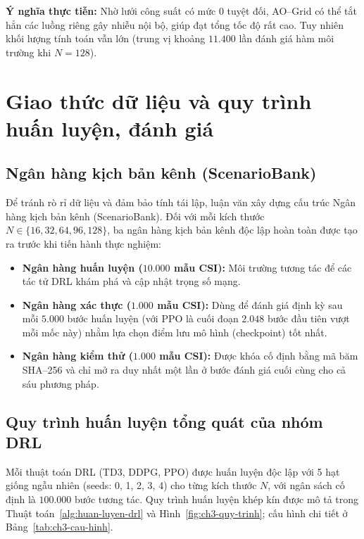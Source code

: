 \textbf{Ý nghĩa thực tiễn:} Nhờ lưới công suất có mức $0$ tuyệt đối, AO--Grid có thể tắt hẳn các luồng riêng gây
nhiễu nội bộ, giúp đạt tổng tốc độ rất cao. Tuy nhiên khối lượng tính toán vẫn lớn (trung vị khoảng $11.400$ lần
đánh giá hàm môi trường khi $N = 128$).



\section{Giao thức dữ liệu và quy trình huấn luyện, đánh giá}
\label{sec:giao-thuc-du-lieu}

\subsection{Ngân hàng kịch bản kênh (ScenarioBank)}
\label{ssec:ngan-hang}

Để tránh rò rỉ dữ liệu và đảm bảo tính tái lập, luận văn xây dựng cấu trúc Ngân hàng kịch bản kênh
(ScenarioBank). Đối với mỗi kích thước $N \in \{16, 32, 64, 96, 128\}$, ba ngân hàng kịch bản kênh độc lập hoàn
toàn được tạo ra trước khi tiến hành thực nghiệm:
\begin{itemize}
\item \textbf{Ngân hàng huấn luyện ($10.000$ mẫu CSI):} Môi trường tương tác để các tác tử DRL khám phá và cập
  nhật trọng số mạng.
\item \textbf{Ngân hàng xác thực ($1.000$ mẫu CSI):} Dùng để đánh giá định kỳ sau mỗi $5.000$ bước huấn luyện
  (với PPO là cuối đoạn $2.048$ bước đầu tiên vượt mỗi mốc này) nhằm lựa chọn điểm lưu mô hình (checkpoint) tốt
  nhất.
\item \textbf{Ngân hàng kiểm thử ($1.000$ mẫu CSI):} Được khóa cố định bằng mã băm SHA--256 và chỉ mở ra duy nhất
  một lần ở bước đánh giá cuối cùng cho cả sáu phương pháp.
\end{itemize}

\subsection{Quy trình huấn luyện tổng quát của nhóm DRL}
\label{ssec:chon-diem-luu}

Mỗi thuật toán DRL (TD3, DDPG, PPO) được huấn luyện độc lập với 5 hạt giống ngẫu nhiên (seeds: 0, 1, 2, 3, 4) cho
từng kích thước $N$, với ngân sách cố định là $100.000$ bước tương tác. Quy trình huấn luyện khép kín được mô tả
trong Thuật toán~\ref{alg:huan-luyen-drl} và Hình~\ref{fig:ch3-quy-trinh}; cấu hình chi tiết ở
Bảng~\ref{tab:ch3-cau-hinh}.

